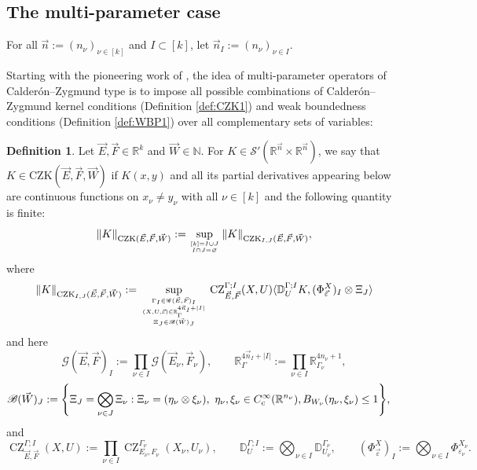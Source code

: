\documentclass[11pt, reqno]{amsart}
\theoremstyle{definition}
\newtheorem{definition}[theorem]{Definition}
\theoremstyle{remark}
\numberwithin{equation}{section}
\newcommand{\vE}{\vec E}
\newcommand{\vF}{\vec F}
\newcommand{\N}{\mathbb N}
\newcommand{\R}{\mathbb R}
\newcommand{\vn}{\vec n}
\newcommand{\eps}{\varepsilon}
\newcommand{\pair}[2]{\langle #1, #2 \rangle}
\newcommand{\abs}[1]{|#1|}
\newcommand{\Norm}[2]{\|#1\|_{#2}}
\begin{document}
\subsection{The multi-parameter case}\label{CZmp}

For all $\vn:=(n_\nu)_{\nu\in[k]}$ and $I\subset[k]$,
let $\vn_I:=(n_{\nu})_{\nu\in I}$.

Starting with the pioneering work of \cite{Journe}, the idea of multi-parameter operators of Calder\'on--Zygmund type is to impose all possible combinations of Calder\'on--Zygmund kernel conditions (Definition \ref{def:CZK1}) and weak boundedness conditions (Definition \ref{def:WBP1}) over all complementary sets of variables:

\begin{definition}\label{def:CZKk}
Let $\vec E,\vec F\in\R^k$ and $\vec W\in\N$.
For $K\in\mathscr S'(\R^{\vn}\times\R^{\vn})$, we say that
$K\in \mathrm{CZK}(\vec E,\vec F,\vec W)$ if $K(x,y)$ and all its partial derivatives appearing below are continuous functions on
$x_\nu\neq y_\nu$ with all $\nu\in[k]$ and the following quantity is finite:
\begin{equation*}
  \Norm{K}{\operatorname{CZK}(\vE,\vF,\vec W)}
  :=
  \sup_{\genfrac{}{}{0pt}{}{[k]=I\cup J}{I\cap J=\varnothing}}
  \Norm{K}{\operatorname{CZK}_{I,J}(\vE,\vF,\vec W)},
\end{equation*}
where
\begin{equation*}
 \Norm{K}{\operatorname{CZK}_{I,J}(\vE,\vF,\vec W)}
  :=\sup_{\genfrac{}{}{0pt}{}{\Gamma_I\in\mathscr G(\vE,\vF)_I}{\genfrac{}{}{0pt}{}{(X,U,\vec\eps)\in\R^{4\vn_I+\abs{I}}_{\Gamma}}{
    \Xi_{J}\in \mathscr B(\vec W)_J}}}
  \operatorname{CZ}_{\vE,\vF}^{\Gamma;I}(X,U)
  \pair{\mathbb D^{\Gamma;I}_U K}{(\Phi_{\vec\eps}^X)_I\otimes \Xi_{J}}
\end{equation*}
and here
\begin{equation*}
  \mathscr G(\vE,\vF)_I
  :=\prod_{\nu\in I}\mathscr G(\vE_\nu,\vF_\nu),\qquad
  \R^{4\vn_I+\abs{I}}_{\Gamma}
  :=\prod_{\nu\in I}\R^{4n_\nu+1}_{\Gamma_\nu},
\end{equation*}
\begin{equation*}
\begin{split}
  \mathscr B(\vec W)_J
  &:=\Bigg\{\Xi_J=\bigotimes_{\nu\in J}\Xi_\nu:
  \Xi_\nu=(\eta_\nu\otimes\xi_\nu),\ \eta_\nu,\xi_\nu\in C_{\rm c}^\infty(\R^{n_\nu}),
  B_{W_\nu}(\eta_\nu,\xi_\nu)\leq 1\Bigg\},
\end{split}
\end{equation*}
and
\begin{equation*}
  \operatorname{CZ}_{\vE,\vF}^{\Gamma;I}(X,U)
  :=\prod_{\nu\in I}\operatorname{CZ}_{E_\nu,F_\nu}^{\Gamma_\nu}(X_\nu,U_\nu),
  \qquad
  \mathbb D^{\Gamma;I}_U
  :=\bigotimes_{\nu\in I}\mathbb D^{\Gamma_\nu}_{U_\nu},
  \qquad
  (\Phi_{\vec\eps}^X)_I:=\bigotimes_{\nu\in I}\Phi^{X_\nu}_{\eps_\nu}.
\end{equation*}
\end{definition}
\end{document}
